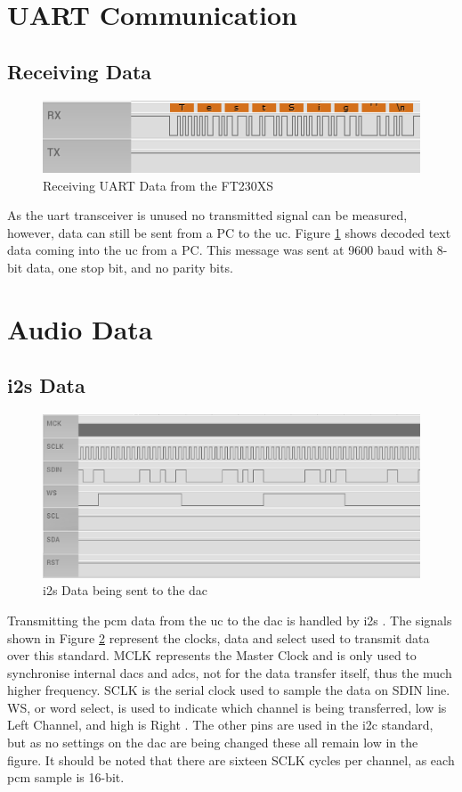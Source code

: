 \documentclass[12pt,a4paper]{report}
\begin{document}
\section{UART Communication}
\subsection{Receiving Data}
\begin{figure}[h!]
	\centering
	\includegraphics[width=0.6 \textwidth]{uart.PNG}
	\caption{Receiving UART Data from the FT230XS \cite{ft230x}}
	\label{fig:uartRX}
\end{figure}
\noindent As the \ac{uart} transceiver is unused no transmitted signal can be measured, however, data can still be sent from a PC to the \ac{uc}. Figure \ref{fig:uartRX} shows decoded text data coming into the \ac{uc} from a PC. This message was sent at 9600 \ac{baud} with 8-bit data, one stop bit, and no parity bits. 
\section{Audio Data}
\subsection{\ac{i2s} Data}
\begin{figure}[h!]
	\centering
	\includegraphics[width=0.8 \textwidth]{i2s.PNG}
	\caption{\ac{i2s} Data being sent to the \ac{dac}}
	\label{fig:i2sDac}
\end{figure}
\noindent Transmitting the \ac{pcm} data from the \ac{uc} to the \ac{dac} is handled by \ac{i2s} \cite{dac, f411brd}. The signals shown in Figure \ref{fig:i2sDac} represent the clocks, data and select used to transmit data over this standard. MCLK represents the Master Clock and is only used to synchronise internal \ac{dac}s and \ac{adc}s, not for the data transfer itself, thus the much higher frequency. SCLK is the serial clock used to sample the data on SDIN line. WS, or word select, is used to indicate which channel is being transferred, low is Left Channel, and high is Right \cite{i2s}. The other pins are used in the \ac{i2c} standard, but as no settings on the \ac{dac} are being changed these all remain low in the figure. It should be noted that there are sixteen SCLK cycles per channel, as each \ac{pcm} sample is 16-bit.
\newpage
\end{document}

